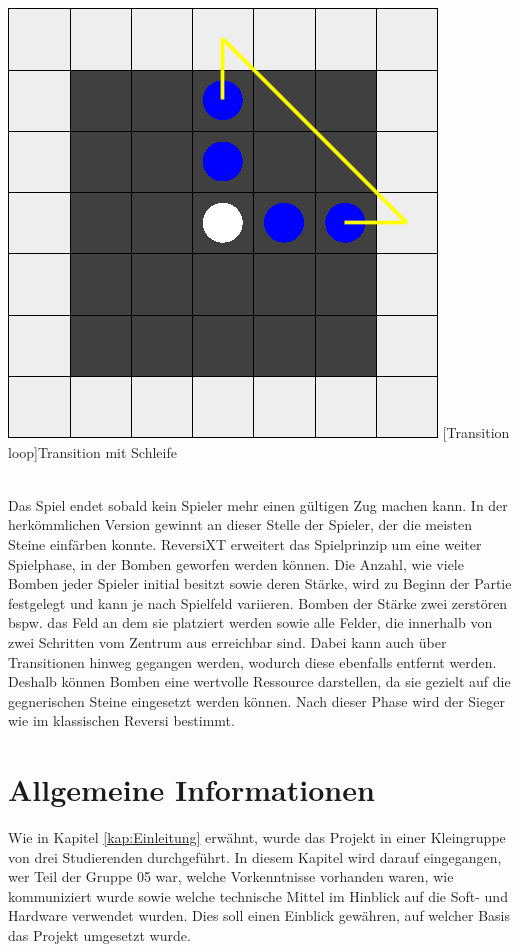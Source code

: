 \documentclass[12pt,a4paper,bibliography=totocnumbered,listof=totocnumbered]{article}
\begin{document}
\vspace{1em}
\begin{minipage}{\linewidth}
	\centering
	\includegraphics[width=0.4\linewidth]{pics/transition_loop.png}
	[Transition loop]{Transition mit Schleife}
	\label{fig:example_transition_loop}
\end{minipage}
\\

Das Spiel endet sobald kein Spieler mehr einen gültigen Zug machen kann. In der herkömmlichen Version gewinnt an dieser Stelle der Spieler, der die meisten Steine einfärben konnte. ReversiXT erweitert das Spielprinzip um eine weiter Spielphase, in der Bomben geworfen werden können. Die Anzahl, wie viele Bomben jeder Spieler initial besitzt sowie deren Stärke, wird zu Beginn der Partie festgelegt und kann je nach Spielfeld variieren. Bomben der Stärke zwei zerstören bspw. das Feld an dem sie platziert werden sowie alle Felder, die innerhalb von zwei Schritten vom Zentrum aus erreichbar sind. Dabei kann auch über Transitionen hinweg gegangen werden, wodurch diese ebenfalls entfernt werden. Deshalb können Bomben eine wertvolle Ressource darstellen, da sie gezielt auf die gegnerischen Steine eingesetzt werden können. Nach dieser Phase wird der Sieger wie im klassischen Reversi bestimmt.


\newpage
\section{Allgemeine Informationen}
Wie in Kapitel \ref{kap:Einleitung} erwähnt, wurde das Projekt in einer Kleingruppe von drei Studierenden durchgeführt. In diesem Kapitel wird darauf eingegangen, wer Teil der Gruppe 05 war, welche Vorkenntnisse vorhanden waren, wie kommuniziert wurde sowie welche technische Mittel im Hinblick auf die Soft- und Hardware verwendet wurden. Dies soll einen Einblick gewähren, auf welcher Basis das Projekt umgesetzt wurde.
\end{document}
